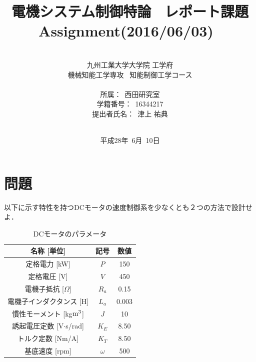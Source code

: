 \documentclass[a4paper,12pt]{jarticle}
\title{電機システム制御特論 \ レポート課題\\
Assignment(2016/06/03)\
}
\author{\vspace{40mm}\\
九州工業大学大学院 \hspace{0mm} 工学府\\
機械知能工学専攻\ \hspace{0mm} 知能制御工学コース \\
\vspace{5mm}\\
所属：\ 西田研究室\\
学籍番号：\ 16344217\\
提出者氏名：\ 津上 \hspace{0mm} 祐典\\\vspace{5mm}\\ }
\date{平成28年\ 6月\ 10日}
\begin{document}
\titlepage
\maketitle

\newpage

\thispagestyle{empty}
\tableofcontents

\newpage
\setcounter{page}{1}
\section{問題}
以下に示す特性を持つDCモータの速度制御系を少なくとも２つの方法で設計せよ．
%
\begin{table}[h]
 \centering
 \caption{DCモータのパラメータ}
 \label{table:DC_dim}
 \begin{tabular}{c|c|c} \hline
  名称 [単位]                    & 記号  & 数値\\\hline
  定格電力 [kW]                  &$P$    &150  \\\hline
  定格電圧 [V]                   &$V$    &450  \\\hline
  電機子抵抗 [$\Omega$]          &$R_a$  & 0.15 \\\hline
  電機子インダクタンス [H]        &$L_a$   &0.003\\\hline
  慣性モーメント [kg$\rm {m^3}$] &$J$     &10  \\\hline
  誘起電圧定数 [V$\cdot$s/rad]    &$K_E$   &8.50 \\\hline
  トルク定数 [Nm/A]               & $K_T$  &8.50 \\\hline
  基底速度 [rpm]                &$\omega$&500  \\\hline
 \end{tabular}
\end{table}
%
\end{document}
